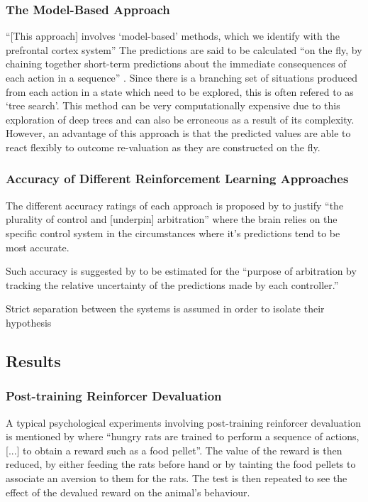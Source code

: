 \documentclass[10pt]{article}
\begin{document}
	\subsubsection{The Model-Based Approach}

		``[This approach] involves `model-based' methods, which we identify with the prefrontal cortex system'' \parencite{Daw} The predictions are said to be calculated ``on the fly, by chaining together short-term predictions about the immediate consequences of each action in a sequence'' \parencite{Daw}. Since there is a branching set of situations produced from each action in a state which need to be explored, this is often refered to as `tree search'. 
		This method can be very computationally expensive due to this exploration of deep trees and can also be erroneous as a result of its complexity. 
		However, an advantage of this approach is that the predicted values are able to react flexibly to outcome re-valuation as they are constructed on the fly.

	\subsubsection{Accuracy of Different Reinforcement Learning Approaches}

		The different accuracy ratings of each approach is proposed by \textcite{Daw} to justify ``the plurality of control and [underpin] arbitration'' where the brain relies on the specific control system in the circumstances where it's predictions tend to be most accurate.

		Such accuracy is suggested by \textcite{Daw} to be estimated for the ``purpose of arbitration by tracking the relative uncertainty of the predictions made by each controller.''

		Strict separation between the systems is assumed in order to isolate their hypothesis


\subsection{Results}

	\subsubsection{Post-training Reinforcer Devaluation}

		A typical psychological experiments involving post-training reinforcer devaluation is mentioned by \textcite{Daw} where ``hungry rats are trained to perform a sequence of actions, [...] to obtain a reward such as a food pellet''. The value of the reward is then reduced, by either feeding the rats before hand or by tainting the food pellets to associate an aversion to them for the rats. The test is then repeated to see the effect of the devalued reward on the animal's behaviour. 
\end{document}
